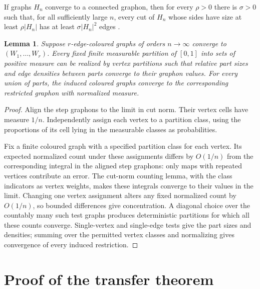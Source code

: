 \documentclass[11pt]{article}
\newtheorem{lemma}[theorem]{Lemma}
\begin{document}
If graphs $H_n$ converge to a connected graphon, then for every $\rho>0$
there is $\sigma>0$ such that, for all sufficiently large $n$, every cut of
$H_n$ whose sides have size at least $\rho|H_n|$ has at least
$\sigma|H_n|^2$ edges \cite[Theorem 1.10(i)]{janson}.

\begin{lemma}\label{lem:realize}
Suppose $r$-edge-coloured graphs of orders $n\to\infty$ converge to
$(W_1,\ldots,W_r)$. Every fixed finite measurable partition of $[0,1]$ into
sets of positive measure can be realized by vertex partitions such that
relative part sizes and edge densities between parts converge to their
graphon values. For every union of parts, the induced coloured graphs
converge to the corresponding restricted graphon with normalized measure.
\end{lemma}
\begin{proof}
Align the step graphons to the limit in cut norm. Their vertex cells have
measure $1/n$. Independently assign each vertex to a partition class, using
the proportions of its cell lying in the measurable classes as probabilities.

Fix a finite coloured graph with a specified partition class for each
vertex. Its expected normalized count under these assignments differs by
$O(1/n)$ from the corresponding integral in the aligned step graphons:
only maps with repeated vertices contribute an error. The cut-norm counting
lemma, with the class indicators as vertex weights, makes these integrals
converge to their values in the limit. Changing one vertex assignment alters
any fixed normalized count by $O(1/n)$, so bounded differences give
concentration. A diagonal choice over the countably many such test graphs
produces deterministic partitions for which all these counts converge.
Single-vertex and single-edge tests give the part sizes and densities;
summing over the permitted vertex classes and normalizing gives convergence
of every induced restriction.
\end{proof}

\section{Proof of the transfer theorem}
\end{document}
